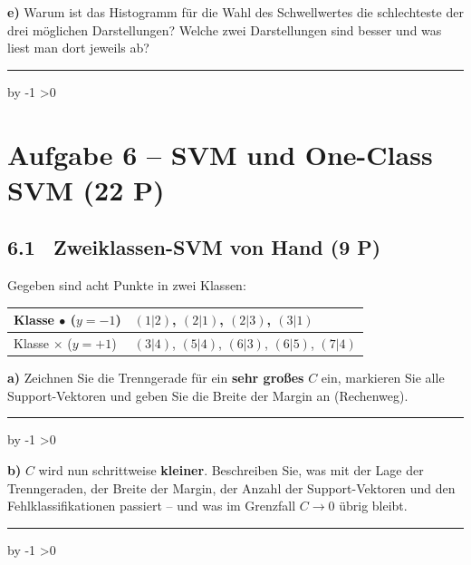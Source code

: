\documentclass[10pt,a4paper]{article}
\newcommand{\antwortlinien}[1]{%
  \par\vspace{2pt}%
  \newcount\zeilen \zeilen=#1
  \loop
    \noindent\rule{\linewidth}{0.4pt}\par\vspace{11pt}%
    \advance\zeilen by -1
  \ifnum\zeilen>0 \repeat
}
\newcommand{\pkt}[1]{\hfill\textbf{(#1 P)}}
\begin{document}
\textbf{e)} Warum ist das Histogramm für die Wahl des Schwellwertes die schlechteste der drei
möglichen Darstellungen? Welche zwei Darstellungen sind besser und was liest man dort jeweils ab?
\antwortlinien{4}

\newpage
\section*{Aufgabe 6 -- SVM und One-Class SVM \pkt{22}}

\subsection*{6.1 \ Zweiklassen-SVM von Hand \pkt{9}}

Gegeben sind acht Punkte in zwei Klassen:

\begin{center}\small
\begin{tabular}{|l|l|}
\hline
Klasse $\bullet$ ($y = -1$) & $(1|2)$, $(2|1)$, $(2|3)$, $(3|1)$\\ \hline
Klasse $\times$ ($y = +1$) & $(3|4)$, $(5|4)$, $(6|3)$, $(6|5)$, $(7|4)$\\ \hline
\end{tabular}
\end{center}

\begin{center}
\end{center}

\textbf{a)} Zeichnen Sie die Trenngerade für ein \textbf{sehr großes} $C$ ein, markieren Sie alle
Support-Vektoren und geben Sie die Breite der Margin an (Rechenweg).
\antwortlinien{4}

\textbf{b)} $C$ wird nun schrittweise \textbf{kleiner}. Beschreiben Sie, was mit der Lage der
Trenngeraden, der Breite der Margin, der Anzahl der Support-Vektoren und den
Fehlklassifikationen passiert -- und was im Grenzfall $C \to 0$ übrig bleibt.
\antwortlinien{5}
\end{document}
